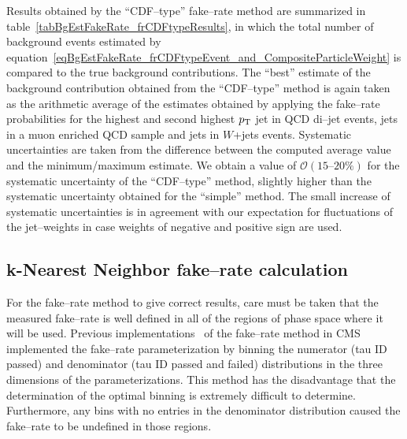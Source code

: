 Results obtained by the ``CDF--type'' fake--rate method are summarized in
table~\ref{tabBgEstFakeRate_frCDFtypeResults}, in which the total number of
background events estimated by
equation~\ref{eqBgEstFakeRate_frCDFtypeEvent_and_CompositeParticleWeight} is
compared to the true background contributions.  The ``best'' estimate of the
background contribution obtained from the ``CDF--type'' method is again taken as
the arithmetic average of the estimates obtained by applying the fake--rate
probabilities for the highest and second highest $p_{\mathrm{T}}$ jet in QCD di--jet
events, jets in a muon enriched QCD sample and jets in $W$+jets events.
Systematic uncertainties are taken from the difference between the computed
average value and the minimum/maximum estimate.  We obtain a value of
$\mathcal{O} \left( 15 \mbox{--} 20 \% \right)$ for the systematic uncertainty
of the ``CDF--type'' method, slightly higher than the systematic uncertainty
obtained for the ``simple'' method.  The small increase of systematic
uncertainties is in agreement with our expectation for fluctuations of the
jet--weights in case weights of negative and positive sign are used.

\subsection{k-Nearest Neighbor fake--rate calculation}
For the fake--rate method to give correct results, care must be taken that the
measured fake--rate is well defined in all of the regions of phase space where
it will be used.  Previous implementations~\cite{CMS_AN_2010-074} of the
fake--rate method in CMS implemented the fake--rate parameterization by binning
the numerator (tau ID passed) and denominator (tau ID passed and failed)
distributions in the three dimensions of the parameterizations. This method has
the disadvantage that the determination of the optimal binning is extremely
difficult to determine. Furthermore, any bins with no entries in the denominator
distribution caused the fake--rate to be undefined in those regions.

